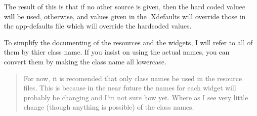 \documentclass[titlepage]{article}
\begin{document}
The result of this is that if no other source is given, then the hard
coded valuee will be used, otherwise, and values given in the
.Xdefaults will override those in the app-defaults file which will
override the hardcoded values.

To simplify the documenting of the resources and the widgets, I will
refer to all of them by thier class name. If you insist on using the
actual names, you can convert them by making the class name all lowercase.
\begin{quote}
For now, it is recomended that only class names be used in the
resource files. This is because in the near future the names for each
widget will probably be changing and I'm not sure how yet. Where as I
see very little change (though anything is possible) of the class
names.
\end{quote}
\end{document}
